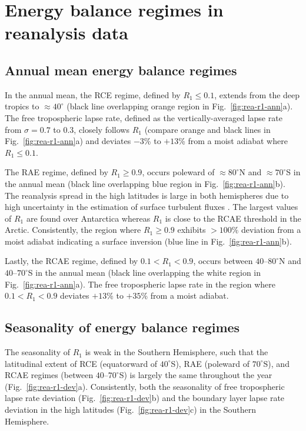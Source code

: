 \documentclass{ametsocV5}
\begin{document}
\section{Energy balance regimes in reanalysis data} \label{sec:diagnostics}
    \subsection{Annual mean energy balance regimes}
    In the annual mean, the RCE regime, defined by $R_1 \le 0.1$, extends from the deep tropics to $\approx 40^\circ$ (black line overlapping orange region in Fig.~\ref{fig:rea-r1-ann}a). The free tropospheric lapse rate, defined as the vertically-averaged lapse rate from $\sigma=0.7$ to 0.3, closely follows $R_1$ (compare orange and black lines in Fig.~\ref{fig:rea-r1-ann}a) and deviates $-3$\% to $+13$\% from a moist adiabat where $R_1 \le 0.1$.

    The RAE regime, defined by $R_1 \ge 0.9$, occurs poleward of $\approx 80^\circ$N and $\approx 70^\circ$S in the annual mean (black line overlapping blue region in Fig.~\ref{fig:rea-r1-ann}b). The reanalysis spread in the high latitudes is large in both hemispheres due to high uncertainty in the estimation of surface turbulent fluxes \citep{tastula2013,graham2019}. The largest values of $R_1$ are found over Antarctica whereas $R_1$ is close to the RCAE threshold in the Arctic. Consistently, the region where $R_1\ge 0.9$ exhibits $>100\%$ deviation from a moist adiabat indicating a surface inversion (blue line in Fig.~\ref{fig:rea-r1-ann}b).

    Lastly, the RCAE regime, defined by $0.1 < R_1 < 0.9$, occurs between $40$--$80^\circ$N and $40$--$70^\circ$S in the annual mean (black line overlapping the white region in Fig.~\ref{fig:rea-r1-ann}a). The free tropospheric lapse rate in the region where $0.1 < R_1 < 0.9$ deviates $+13$\% to $+35$\% from a moist adiabat.

    \subsection{Seasonality of energy balance regimes} \label{subsec:seasonality}
    The seasonality of $R_1$ is weak in the Southern Hemisphere, such that the latitudinal extent of RCE (equatorward of $40^\circ$S), RAE (poleward of $70^\circ$S), and RCAE regimes (between $40$--$70^\circ$S) is largely the same throughout the year (Fig.~\ref{fig:rea-r1-dev}a). Consistently, both the seasonality of free tropospheric lapse rate deviation (Fig.~\ref{fig:rea-r1-dev}b) and the boundary layer lapse rate deviation in the high latitudes (Fig.~\ref{fig:rea-r1-dev}c)  in the Southern Hemisphere.
\end{document}
